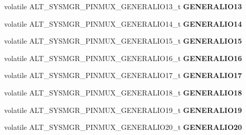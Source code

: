 \begin{DoxyCompactItemize}
\mbox{\label{structALT__SYSMGR__PINMUX__s_af2027a9842a85bc13b9ab440c06160e7}} 
volatile A\+L\+T\+\_\+\+S\+Y\+S\+M\+G\+R\+\_\+\+P\+I\+N\+M\+U\+X\+\_\+\+G\+E\+N\+E\+R\+A\+L\+I\+O13\+\_\+t {\bfseries G\+E\+N\+E\+R\+A\+L\+I\+O13}
\item 
\mbox{\label{structALT__SYSMGR__PINMUX__s_afa01773b4bb413fa639d2a3bdc5fe27e}} 
volatile A\+L\+T\+\_\+\+S\+Y\+S\+M\+G\+R\+\_\+\+P\+I\+N\+M\+U\+X\+\_\+\+G\+E\+N\+E\+R\+A\+L\+I\+O14\+\_\+t {\bfseries G\+E\+N\+E\+R\+A\+L\+I\+O14}
\item 
\mbox{\label{structALT__SYSMGR__PINMUX__s_a47416b8995b01d8c61adee67f3e16a76}} 
volatile A\+L\+T\+\_\+\+S\+Y\+S\+M\+G\+R\+\_\+\+P\+I\+N\+M\+U\+X\+\_\+\+G\+E\+N\+E\+R\+A\+L\+I\+O15\+\_\+t {\bfseries G\+E\+N\+E\+R\+A\+L\+I\+O15}
\item 
\mbox{\label{structALT__SYSMGR__PINMUX__s_a79d1fc22f7b22f1a2219bf36371da863}} 
volatile A\+L\+T\+\_\+\+S\+Y\+S\+M\+G\+R\+\_\+\+P\+I\+N\+M\+U\+X\+\_\+\+G\+E\+N\+E\+R\+A\+L\+I\+O16\+\_\+t {\bfseries G\+E\+N\+E\+R\+A\+L\+I\+O16}
\item 
\mbox{\label{structALT__SYSMGR__PINMUX__s_ab3654931efa8b376782e9a40f43ee444}} 
volatile A\+L\+T\+\_\+\+S\+Y\+S\+M\+G\+R\+\_\+\+P\+I\+N\+M\+U\+X\+\_\+\+G\+E\+N\+E\+R\+A\+L\+I\+O17\+\_\+t {\bfseries G\+E\+N\+E\+R\+A\+L\+I\+O17}
\item 
\mbox{\label{structALT__SYSMGR__PINMUX__s_aa8c47b2714683a3cc63c12be6f3619ea}} 
volatile A\+L\+T\+\_\+\+S\+Y\+S\+M\+G\+R\+\_\+\+P\+I\+N\+M\+U\+X\+\_\+\+G\+E\+N\+E\+R\+A\+L\+I\+O18\+\_\+t {\bfseries G\+E\+N\+E\+R\+A\+L\+I\+O18}
\item 
\mbox{\label{structALT__SYSMGR__PINMUX__s_a8ad86e1d86d1e5c85e847e9bb4a9f01e}} 
volatile A\+L\+T\+\_\+\+S\+Y\+S\+M\+G\+R\+\_\+\+P\+I\+N\+M\+U\+X\+\_\+\+G\+E\+N\+E\+R\+A\+L\+I\+O19\+\_\+t {\bfseries G\+E\+N\+E\+R\+A\+L\+I\+O19}
\item 
\mbox{\label{structALT__SYSMGR__PINMUX__s_a4806f8b9de828e12f300bd74c03ea66c}} 
volatile A\+L\+T\+\_\+\+S\+Y\+S\+M\+G\+R\+\_\+\+P\+I\+N\+M\+U\+X\+\_\+\+G\+E\+N\+E\+R\+A\+L\+I\+O20\+\_\+t {\bfseries G\+E\+N\+E\+R\+A\+L\+I\+O20}

\end{DoxyCompactItemize}
